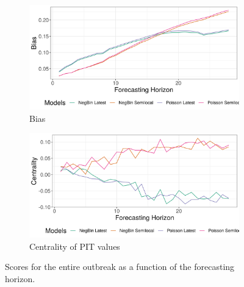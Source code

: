 \begin{figure}[H]
\begin{subfigure}{0.5\textwidth}
  \centering
  \includegraphics[width=\linewidth]{../output/Kayina_bias.png}  
  \caption{Bias}
  \label{fig:sub-third}
\end{subfigure}
\begin{subfigure}{0.5\textwidth}
  \centering
  \includegraphics[width=\linewidth]{../output/Kayina_centrality.png}  
  \caption{Centrality of PIT values}
  \label{fig:nat_scores_4}
\end{subfigure}
  \caption{Scores for the entire outbreak as a function of the forecasting horizon.}

  \label{fig:nat_scores}
\end{figure}

